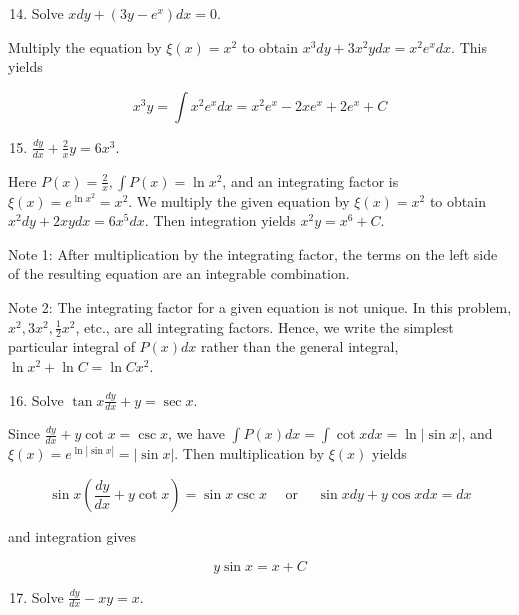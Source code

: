 \documentclass[10pt]{article}
\begin{document}
\begin{enumerate}
  \setcounter{enumi}{13}
  \item Solve $x d y+\left(3 y-e^{x}\right) d x=0$.
\end{enumerate}

Multiply the equation by $\xi(x)=x^{2}$ to obtain $x^{3} d y+3 x^{2} y d x=x^{2} e^{x} d x$. This yields

$$
x^{3} y=\int x^{2} e^{x} d x=x^{2} e^{x}-2 x e^{x}+2 e^{x}+C
$$

\begin{enumerate}
  \setcounter{enumi}{14}
  \item $\frac{d y}{d x}+\frac{2}{x} y=6 x^{3}$.
\end{enumerate}

Here $P(x)=\frac{2}{x}, \int P(x)=\ln x^{2}$, and an integrating factor is $\xi(x)=e^{\ln x^{2}}=x^{2}$. We multiply the given equation by $\xi(x)=x^{2}$ to obtain $x^{2} d y+2 x y d x=6 x^{5} d x$. Then integration yields $x^{2} y=x^{6}+C$.

Note 1: After multiplication by the integrating factor, the terms on the left side of the resulting equation are an integrable combination.

Note 2: The integrating factor for a given equation is not unique. In this problem, $x^{2}, 3 x^{2}, \frac{1}{2} x^{2}$, etc., are all integrating factors. Hence, we write the simplest particular integral of $P(x) d x$ rather than the general integral, $\ln x^{2}+\ln C=\ln C x^{2}$.

\begin{enumerate}
  \setcounter{enumi}{15}
  \item Solve $\tan x \frac{d y}{d x}+y=\sec x$.
\end{enumerate}

Since $\frac{d y}{d x}+y \cot x=\csc x$, we have $\int P(x) d x=\int \cot x d x=\ln |\sin x|$, and $\xi(x)=e^{\ln |\sin x|}=|\sin x|$. Then multiplication by $\xi(x)$ yields

$$
\sin x\left(\frac{d y}{d x}+y \cot x\right)=\sin x \csc x \quad \text { or } \quad \sin x d y+y \cos x d x=d x
$$

and integration gives

$$
y \sin x=x+C
$$

\begin{enumerate}
  \setcounter{enumi}{16}
  \item Solve $\frac{d y}{d x}-x y=x$.
\end{enumerate}
\end{document}

